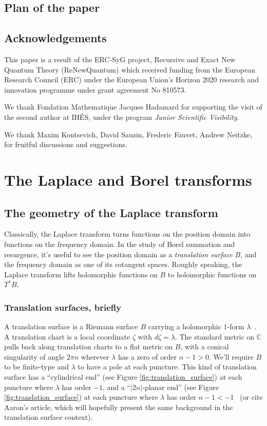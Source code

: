 \documentclass{article}
\theoremstyle{definition}
\newcommand{\C}{\mathbb{C}}
\begin{document}
\subsection{Plan of the paper}


\subsection{Acknowledgements}

This paper is a result of the ERC-SyG project, Recursive and Exact New Quantum Theory (ReNewQuantum) which received funding from the European Research Council (ERC) under the European Union's Horizon 2020 research and innovation programme under grant agreement No 810573. 

We thank Fondation Mathematique Jacques Hadamard for supporting the visit of the second author at IH\'ES, under the program \textit{Junior Scientific Visibility}. 

We thank Maxim Kontsevich, David Sauzin, Frederic Fauvet, Andrew Neitzke, for fruitful discussions and suggestions. 

\section{The Laplace and Borel transforms}\label{sec:Laplace-Borel-general}
\subsection{The geometry of the Laplace transform}

Classically, the Laplace transform turns functions on the position domain into functions on the frequency domain. In the study of Borel summation and resurgence, it's useful to see the position domain as a {\em translation surface} $B$, and the frequency domain as one of its cotangent spaces. Roughly speaking, the Laplace transform lifts holomorphic functions on $B$ to holomorphic functions on $T^* B$.
\subsubsection{Translation surfaces, briefly}

A translation surface is a Riemann surface $B$ carrying a holomorphic $1$-form $\lambda$~\cite{zorich2006flat}. A translation chart is a local coordinate $\zeta$ with $d\zeta = \lambda$. The standard metric on $\C$ pulls back along translation charts to a flat metric on $B$, with a conical singularity of angle $2\pi n$ wherever $\lambda$ has a zero of order $n-1 > 0$. We'll require $B$ to be finite-type and $\lambda$ to have a pole at each puncture. This kind of translation surface has a ``cylindrical end'' (see Figure \ref{fig:translation_surface}) at each puncture where $\lambda$ has order $-1$, and a ``$|2n|$-planar end'' (see Figure \ref{fig:translation_surface}) at each puncture where $\lambda$ has order $n-1 < -1$~\cite[Section 2.5]{gupta2013meromorphic} (or cite Aaron's article, which will hopefully present the same background in the translation surface context).
\end{document}
